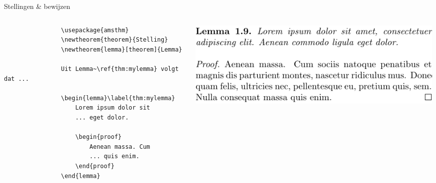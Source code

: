 \begin{frame}[fragile]{Stellingen \& bewijzen}
    \begin{columns}
        \begin{column}{0.4\textwidth}
            \begin{verbatim}
                \usepackage{amsthm}
                \newtheorem{theorem}{Stelling}
                \newtheorem{lemma}[theorem]{Lemma}

                Uit Lemma~\ref{thm:mylemma} volgt dat ...

                \begin{lemma}\label{thm:mylemma}
                    Lorem ipsum dolor sit
                    ... eget dolor.
                    
                    \begin{proof}
                        Aenean massa. Cum
                        ... quis enim.
                    \end{proof}
                \end{lemma}
            \end{verbatim}
        \end{column}
        \begin{column}{0.4\textwidth}
            \includegraphics[width=\linewidth,height=0.8\textheight,keepaspectratio]{assets/mathLemmaProof.pdf}
        \end{column}
    \end{columns}
\end{frame}


